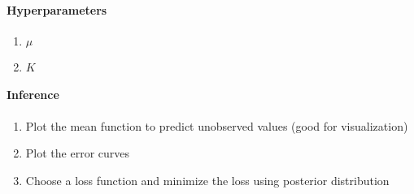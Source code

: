 \documentclass[11pt]{article}
\begin{document}
\paragraph{Hyperparameters}
\begin{enumerate}
	\item $\mu$
	\item $K$
\end{enumerate}
\paragraph{Inference}
\begin{enumerate}
	\item Plot the mean function to predict unobserved values (good for visualization)
	\item Plot the error curves
	\item Choose a loss function and minimize the loss using posterior distribution
\end{enumerate}
\end{document}
